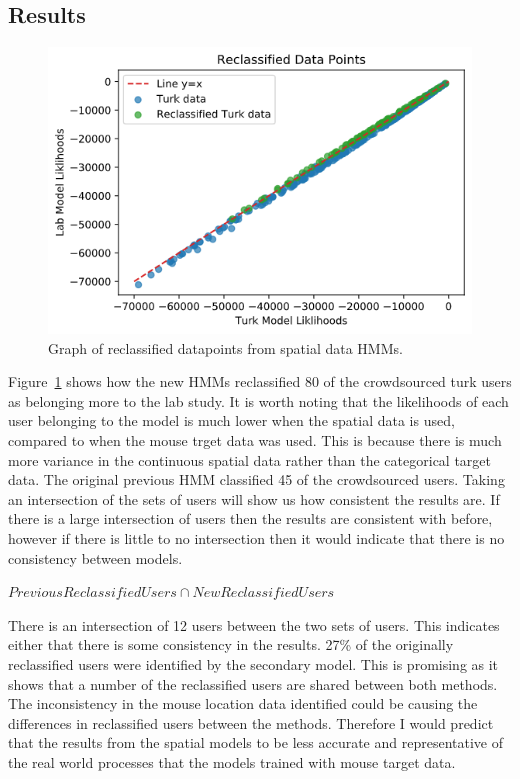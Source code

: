 \documentclass{article}
\begin{document}

\subsection{Results}

\begin{figure}[ht!]
    \centering
    \includegraphics[scale=0.5]{Images/Spatial-Reclassified-Data.png}
    \caption{Graph of reclassified datapoints from spatial data HMMs.}
    \label{fig:SpatialRecData}
\end{figure}


Figure~\ref{fig:SpatialRecData} shows how the new HMMs reclassified 80 of the crowdsourced turk users as belonging more to the lab study.
It is worth noting that the likelihoods of each user belonging to the model is much lower when the spatial data is used, compared to when the mouse trget data was used.
This is because there is much more variance in the continuous spatial data rather than the categorical target data.
The original previous HMM classified 45 of the crowdsourced users.
Taking an intersection of the sets of users will show us how consistent the results are.
If there is a large intersection of users then the results are consistent with before, however if there is little to no intersection then it would indicate that there is no consistency between models. 

${Previous Reclassified Users} \cap {New Reclassified Users}$

There is an intersection of 12 users between the two sets of users.
This indicates either that there is some consistency in the results.
27\% of the originally reclassified users were identified by the secondary model. 
This is promising as it shows that a number of the reclassified users are shared between both methods.
The inconsistency in the mouse location data identified could be causing the differences in reclassified users between the methods.
Therefore I would predict that the results from the spatial models to be less accurate and representative of the real world processes that the models trained with mouse target data. 
\end{document}
